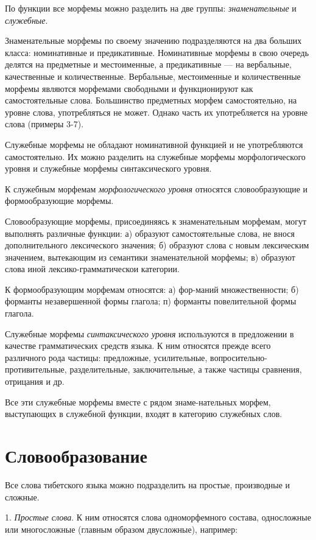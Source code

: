 По функции все морфемы можно разделить на две группы: \emph{знаменательные} и \emph{служебные}.

Знаменательные морфемы по своему значению подразделяются на два больших класса: номинативные и предикативные. Номинативные морфемы в свою очередь делятся на предметные и местоименные, а предикативные --- на вербальные, качественные и количественные. Вербальные, местоименные и количественные морфемы являются морфемами свободными и функционируют как самостоятельные слова. Большинство предметных морфем самостоятельно, на уровне слова, употребляться не может. Однако часть их употребляется на уровне слова (примеры 3-7).

Служебные морфемы не обладают номинативной функцией и не употребляются самостоятельно. Их можно разделить на служебные морфемы морфологического уровня и служебные морфемы синтаксического уровня.

К служебным морфемам \emph{морфологического уровня} относятся словообразующие и формообразующие морфемы.

Словообразующие морфемы, присоединяясь к знаменательным морфемам, могут выполнять различные функции: а) образуют самостоятельные слова, не внося дополнительного лексического значения; б) образуют слова с новым лексическим значением, вытекающим из семантики знаменательной морфемы; в) образуют слова иной лексико-грамматическои категории.

К формообразующим морфемам относятся: а) фор-маний множественности; б) форманты незавершенной формы глагола; п) форманты повелительной формы глагола.

Служебные морфемы \emph{синтаксического уровня} используются в предложении в качестве грамматических средств языка. К ним относятся прежде всего различного рода частицы: предложные, усилительные, вопросительно-противительные, разделительные, заключительные, а также частицы сравнения, отрицания и др.

Все эти служебные морфемы вместе с рядом знаме-нательных морфем, выступающих в служебной функции, входят в категорию служебных слов.

\section{Словообразование}

Все слова тибетского языка можно подразделить на простые, производные и сложные.

1. \emph{Простые слова}. К ним относятся слова одноморфемного состава, односложные или многосложные (главным образом двусложные), например:

